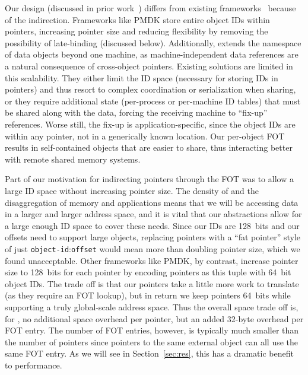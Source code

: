 {    Our design (discussed in prior work~\cite{bittman:hotstorage19,bittman:plos19}) differs from existing
    frameworks~\cite{corbato_introduction_1965,bensoussan:sosp69,daley:cacm68,pmdk-pointers,libpmem,Chen:micro17}
    because of the indirection. Frameworks like PMDK store entire object IDs within pointers,
    increasing pointer size and reducing flexibility by removing
    the possibility of late-binding (discussed below). Additionally, \Twizzler extends the
    namespace of data objects beyond one machine, as machine-independent data references
    are a natural consequence of cross-object pointers. Existing solutions are limited
    in this scalability. They either limit the ID space (necessary for storing IDs
    in pointers) and thus resort to complex coordination or serialization when sharing, or
    they require additional state (\eg per-process or per-machine ID tables) that must
    be shared along with the data, forcing the receiving machine to ``fix-up''
    references. Worse still, the fix-up is application-specific, since the object IDs are
    within any pointer, not in a generically known location.
    Our per-object FOT results in self-contained objects that are easier to share, thus interacting better with remote shared memory systems.

    Part of our motivation for indirecting pointers through the FOT was to allow a large ID space
    without increasing pointer size. The density of \NVM and the disaggregation of memory and
    applications means that we will be accessing data in a larger and larger address space, and it is
    vital that our abstractions allow for a large enough ID space to cover these needs. Since our IDs
    are 128~bits and our offsets need to support large objects, replacing pointers with a ``fat
    pointer'' style of just \texttt{object-id}:\texttt{offset} would mean more than doubling pointer
    size, which we found unacceptable. Other frameworks like PMDK, by contrast, increase pointer size to 128~bits for each
    pointer by encoding pointers as this tuple with 64~bit object IDs. The trade off is that our
    pointers take a little more work to translate (as they require an FOT lookup), but in return we keep
    pointers 64~bits while supporting a truly global-scale address space. Thus the overall space trade off is, for \Twizzler, no additional space overhead
    per pointer, but an added 32-byte overhead per FOT entry.
    The number of FOT entries, however, is typically much smaller than the number of
    pointers since pointers to the same external object can all use the same FOT entry. As we will see
    in Section~\ref{sec:res}, this has a dramatic benefit to performance.


}
